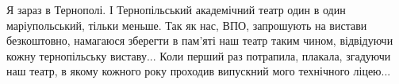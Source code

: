  
 
 
 
 


Я зараз в Тернополі. І Тернопільський академічний театр один в один
маріупольський, тільки меньше. Так як нас, ВПО, запрошують на вистави
безкоштовно, намагаюся зберегти в пам'яті наш театр таким чином, відвідуючи
кожну тернопільську виставу... Коли перший раз потрапила, плакала, згадуючи наш
театр, в якому кожного року проходив випускний мого технічного ліцею...
